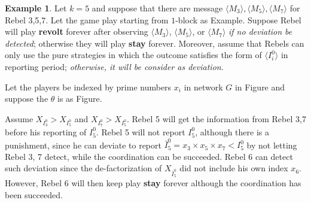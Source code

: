 \documentclass[12pt,letter]{article}
\theoremstyle{definition}
\newtheorem{example}{Example}[section]
\theoremstyle{remark}
\theoremstyle{claim}
\begin{document}
\begin{example}\label{ex_deviation}
Let $k=5$ and suppose that there are message $\langle M_3 \rangle,\langle M_5 \rangle, \langle M_7 \rangle$ for Rebel 3,5,7. Let the game play starting from $1$-block as Example. Suppose Rebel will play \textbf{revolt} forever after observing $\langle M_3 \rangle$, $\langle M_5 \rangle$, or $\langle M_7 \rangle$ \textit{if no deviation be detected}; otherwise they will play \textbf{stay} forever. Moreover, assume that Rebels can only use the pure strategies in which the outcome satisfies the form of $\langle I^0_i \rangle$ in reporting period; \textit{otherwise, it  will be consider as deviation}. 

Let the players be indexed by prime numbers $x_i$ in network $G$ in Figure and suppose the $\theta$ is as Figure.
\begin{center}
\end{center}



\begin{center}
\end{center}

Assume $X_{I^0_3}>X_{I^0_5}$ and $X_{I^0_7}>X_{I^0_5}$. Rebel 5 will get the information from Rebel 3,7 before his reporting of $I^0_5$. Rebel 5 will not report $I^0_5$, although there is a punishment, since he can deviate to report $\bar{I}^0_5=x_3\times x_5\times x_7<I^0_5$ by not letting Rebel 3, 7 detect, while the coordination can be succeeded. Rebel 6 can detect such deviation since the de-factorization of $X_{\bar{I}^0_5}$ did not include his own index $x_6$. However, Rebel 6 will then keep play \textbf{stay} forever although the coordination has been succeeded.

\end{example}
\end{document}
